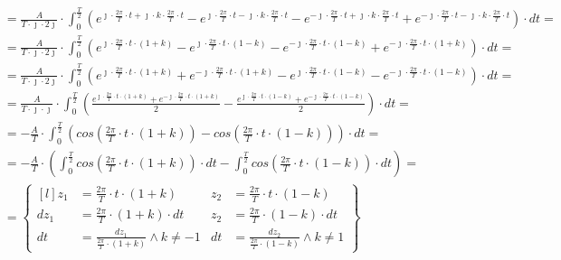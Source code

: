 \begin{task}
\begin{align*}
&=\frac{A}{T\cdot \jmath \cdot 2\jmath} \cdot \int_{0}^{\frac{T}{2}}
\left(e^{\jmath \cdot \frac{2\pi}{T} \cdot t + \jmath \cdot k \cdot \frac{2\pi}{T} \cdot t} - e^{\jmath \cdot \frac{2\pi}{T} \cdot t -\jmath \cdot k \cdot \frac{2\pi}{T} \cdot t} - e^{-\jmath \cdot \frac{2\pi}{T} \cdot t+ \jmath \cdot k \cdot \frac{2\pi}{T} \cdot t} + e^{-\jmath \cdot \frac{2\pi}{T} \cdot t -\jmath \cdot k \cdot \frac{2\pi}{T} \cdot t} \right) \cdot dt=\\
&=\frac{A}{T\cdot \jmath \cdot 2\jmath} \cdot \int_{0}^{\frac{T}{2}}
\left(e^{\jmath \cdot \frac{2\pi}{T} \cdot t \cdot \left(1+k\right)} - e^{\jmath \cdot \frac{2\pi}{T} \cdot t \cdot \left(1 - k\right)} - e^{-\jmath \cdot \frac{2\pi}{T} \cdot t \cdot \left(1 -k\right)} + e^{-\jmath \cdot \frac{2\pi}{T} \cdot t \cdot \left(1+k\right)} \right) \cdot dt=\\
&=\frac{A}{T\cdot\jmath\cdot 2\jmath} \cdot \int_{0}^{\frac{T}{2}}
\left(e^{\jmath \cdot \frac{2\pi}{T} \cdot t \cdot \left(1+k\right)} + e^{-\jmath \cdot \frac{2\pi}{T} \cdot t \cdot \left(1+k\right)} - e^{\jmath \cdot \frac{2\pi}{T} \cdot t \cdot \left(1 - k\right)} - e^{-\jmath \cdot \frac{2\pi}{T} \cdot t \cdot \left(1 -k\right)} \right) \cdot dt=\\
&=\frac{A}{T\cdot \jmath \cdot \jmath} \cdot \int_{0}^{\frac{T}{2}}
\left( \frac{e^{\jmath \cdot \frac{2\pi}{T} \cdot t \cdot \left(1+k\right)} + e^{-\jmath \cdot \frac{2\pi}{T} \cdot t \cdot \left(1+k\right)}}{2} - \frac{e^{\jmath \cdot \frac{2\pi}{T} \cdot t \cdot \left(1 - k\right)} + e^{-\jmath \cdot \frac{2\pi}{T} \cdot t \cdot \left(1 -k\right)}}{2} \right) \cdot dt=\\
&=-\frac{A}{T} \cdot \int_{0}^{\frac{T}{2}}
\left( cos\left( \frac{2\pi}{T} \cdot t \cdot \left(1+k\right) \right) - cos\left( \frac{2\pi}{T} \cdot t \cdot \left(1 - k\right)\right) \right) \cdot dt=\\
&=-\frac{A}{T} \cdot \left( \int_{0}^{\frac{T}{2}}
cos\left( \frac{2\pi}{T} \cdot t \cdot \left(1+k\right) \right) \cdot dt - \int_{0}^{\frac{T}{2}} cos\left( \frac{2\pi}{T} \cdot t \cdot \left(1 - k\right)\right) \cdot dt \right)=\\
&=\begin{Bmatrix*}[l]
z_1&=\frac{2\pi}{T} \cdot t \cdot \left(1+k\right) & z_2&=\frac{2\pi}{T} \cdot t \cdot \left(1-k\right)\\
dz_1&=\frac{2\pi}{T} \cdot \left(1+k\right) \cdot dt & z_2&=\frac{2\pi}{T} \cdot \left(1-k\right) \cdot dt\\
dt&=\frac{dz_1}{\frac{2\pi}{T} \cdot \left(1+k\right)} \wedge k \neq -1& dt&=\frac{dz_2}{\frac{2\pi}{T} \cdot \left(1-k\right)} \wedge k \neq 1

\end{Bmatrix*}
\end{align*}
\end{task}
